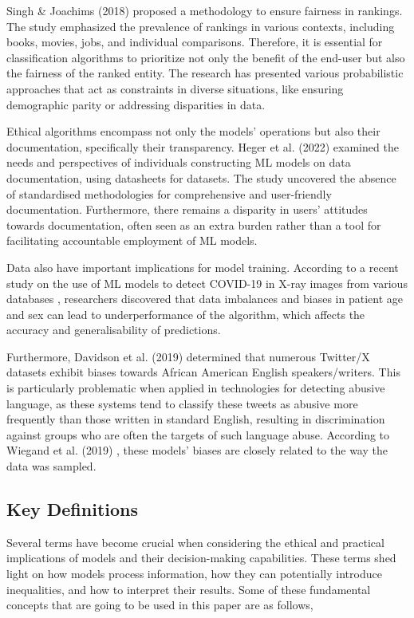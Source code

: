 \documentclass[fleqn,10pt]{wlscirep}
\begin{document}
Singh \& Joachims (2018) \cite{10.1145/3219819.3220088} proposed a methodology to ensure fairness in rankings. The study emphasized the prevalence of rankings in various contexts, including books, movies, jobs, and individual comparisons. Therefore, it is essential for classification algorithms to prioritize not only the benefit of the end-user but also the fairness of the ranked entity. The research has presented various probabilistic approaches that act as constraints in diverse situations, like ensuring demographic parity or addressing disparities in data.

Ethical algorithms encompass not only the models' operations but also their documentation, specifically their transparency. Heger et al. (2022)\cite{https://doi.org/10.48550/arxiv.2206.02923} examined the needs and perspectives of individuals constructing ML models on data documentation, using datasheets for datasets. The study uncovered the absence of standardised methodologies for comprehensive and user-friendly documentation. Furthermore, there remains a disparity in users' attitudes towards documentation, often seen as an extra burden rather than a tool for facilitating accountable employment of ML models.

Data also have important implications for model training. According to a recent study on the use of ML models to detect COVID-19 in X-ray images from various databases \cite{Arias-Garzón2023}, researchers discovered that data imbalances and biases in patient age and sex can lead to underperformance of the algorithm, which affects the accuracy and generalisability of predictions.

Furthermore, Davidson et al. (2019) \cite{davidson2019racial} determined that numerous Twitter/X datasets exhibit biases towards African American English speakers/writers. This is particularly problematic when applied in technologies for detecting abusive language, as these systems tend to classify these tweets as abusive more frequently than those written in standard English, resulting in discrimination against groups who are often the targets of such language abuse. According to Wiegand et al. (2019) \cite{wiegand-etal-2019-detection}, these models' biases are closely related to the way the data was sampled. 

\subsection{Key Definitions}

Several terms have become crucial when considering the ethical and practical implications of models and their decision-making capabilities. These terms shed light on how models process information, how they can potentially introduce inequalities, and how to interpret their results. Some of these fundamental concepts that are going to be used in this paper are as follows,
\end{document}

